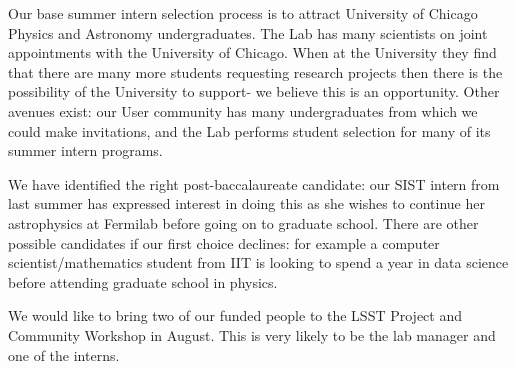 Our base summer intern selection process is to attract
University of Chicago Physics and Astronomy undergraduates.
The Lab has many scientists on joint appointments with
the University of Chicago. When at the University they find
that there are  many more students
requesting research projects then there is the possibility of
the University to support- we believe this is an opportunity.
Other avenues exist: our User community has many undergraduates
from which we could make invitations, 
and the Lab performs student selection for many of its summer
intern programs.

We have identified the right post-baccalaureate candidate:
our SIST intern from last summer has expressed interest in
doing this as she wishes to continue her astrophysics at 
Fermilab before going on to graduate school. There are
other possible candidates if our first choice declines: 
for example a computer scientist/mathematics student
from IIT is looking to spend a year in data science before
attending graduate school in physics.

We would like to bring two of our funded people to the LSST
Project and Community Workshop in August. This is
very likely to be the lab manager and one of the interns.


